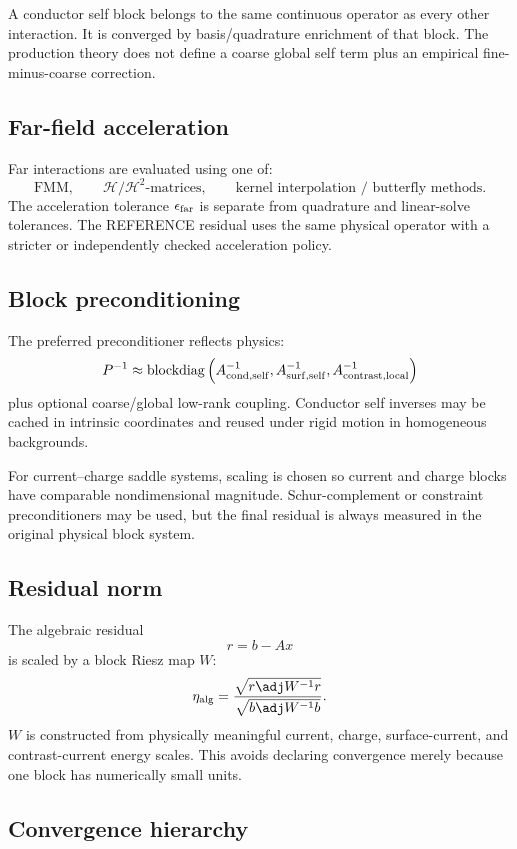 A conductor self block belongs to the same continuous operator as every other
interaction. It is converged by basis/quadrature enrichment of that block. The
production theory does not define a coarse global self term plus an empirical
fine-minus-coarse correction.

\subsection{Far-field acceleration}

Far interactions are evaluated using one of:
\[
  \text{FMM},\qquad
  \mathcal H/\mathcal H^2\text{-matrices},\qquad
  \text{kernel interpolation / butterfly methods}.
\]
The acceleration tolerance $\epsilon_{\rm far}$ is separate from quadrature and
linear-solve tolerances. The REFERENCE residual uses the same physical operator
with a stricter or independently checked acceleration policy.

\subsection{Block preconditioning}

The preferred preconditioner reflects physics:
\[
 P^{-1}
 \approx
 \operatorname{blockdiag}
 \left(
  A_{\rm cond,self}^{-1},
  A_{\rm surf,self}^{-1},
  A_{\rm contrast,local}^{-1}
 \right)
\]
plus optional coarse/global low-rank coupling. Conductor self inverses may be
cached in intrinsic coordinates and reused under rigid motion in homogeneous
backgrounds.

For current--charge saddle systems, scaling is chosen so current and charge
blocks have comparable nondimensional magnitude. Schur-complement or
constraint preconditioners may be used, but the final residual is always
measured in the original physical block system.

\subsection{Residual norm}

The algebraic residual
\[
 r=b-Ax
\]
is scaled by a block Riesz map $W$:
\[
 \eta_{\rm alg}
 =
 \frac{\sqrt{r\adj W^{-1}r}}
      {\sqrt{b\adj W^{-1}b}}.
\]
$W$ is constructed from physically meaningful current, charge, surface-current,
and contrast-current energy scales. This avoids declaring convergence merely
because one block has numerically small units.

\subsection{Convergence hierarchy}

